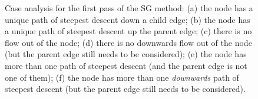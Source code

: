 \documentclass[preprint,a4paper]{elsarticle}
\newenvironment{stusubfig}[1]
{
	\begin{figure}[#1]
	\begin{center}
}
{
	\end{center}
	\end{figure}
}
\begin{document}
\begin{stusubfig}{!t}
	\hspace{4mm}%
\caption{Case analysis for the first pass of the SG method: (a) the node has a unique path of steepest descent down a child edge; (b) the node has a unique path of steepest descent up the parent edge; (c) there is no flow out of the node; (d) there is no downwards flow out of the node (but the parent edge still needs to be considered); (e) the node has more than one path of steepest descent (and the parent edge is not one of them); (f) the node has more than one \emph{downwards} path of steepest descent (but the parent edge still needs to be considered).}
\label{fig:segmentation-waterfall-smg-pass1cases}
\end{stusubfig}
\end{document}
